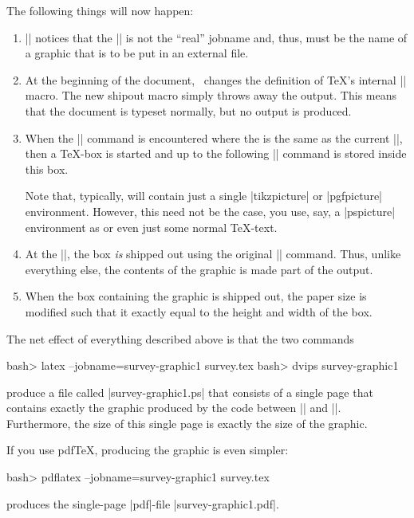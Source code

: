 The following things will now happen:
\begin{enumerate}
\item |\pgfrealjobname| notices that the |\jobname|
  is not the ``real'' jobname and, thus, must be the name of a graphic
  that is to be put in an external file.
\item At the beginning of the document, \pgfname\ changes the
  definition of \TeX's internal |\shipout| macro. The new shipout
  macro simply throws away the output. This means that the document is
  typeset normally, but no output is produced.
\item When the || command is
  encountered where the  is the same as the current
  |\jobname|, then a \TeX-box is started and  up to the
  following |\endpgfgraphicnamed| command is stored inside this box.

  Note that, typically,  will contain just a single
  |{tikzpicture}| or |{pgfpicture}| environment. However, this need
  not be the case, you use, say, a |{pspicture}| environment as
   or even just some normal \TeX-text.  
\item At the |\endpgfgraphicnamed|, the box \emph{is} shipped out
  using the original |\shipout| command. Thus, unlike everything else,
  the contents of the graphic is made part of the output.
\item When the box containing the graphic is shipped out, the paper
  size is modified such that it exactly equal to the height and width
  of the box. 
\end{enumerate}

The net effect of everything described above is that the two
commands
\begin{codeexample}
bash> latex --jobname=survey-graphic1 survey.tex
bash> dvips survey-graphic1
\end{codeexample}
\noindent produce a file called |survey-graphic1.ps| that consists of a single
page that contains exactly the graphic produced by the code between
|| and
|\endpgfgraphicnamed|. Furthermore, the size of this single page is
exactly the size of the graphic.

If you use pdf\TeX, producing the graphic is even simpler:
\begin{codeexample}
bash> pdflatex --jobname=survey-graphic1 survey.tex
\end{codeexample}
\noindent produces the single-page |pdf|-file |survey-graphic1.pdf|.

